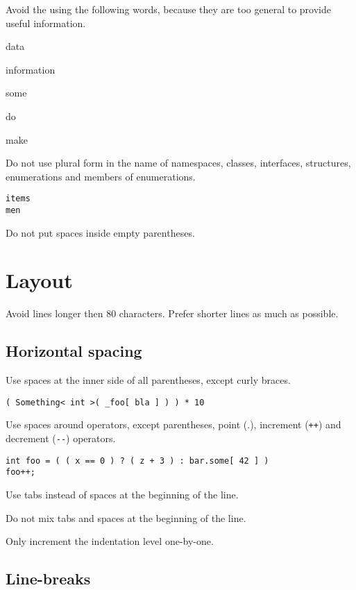 \documentclass[11pt,a4paper]{book}
\begin{document}
\avoidmark Avoid the using the following words, because they are too general to provide useful information.
\begin{compactitem}
\item data
\item information
\item some
\item do
\item make
\end{compactitem}

\notmark Do not use plural form in the name of namespaces, classes, interfaces, structures, enumerations and members of enumerations.
\begin{verbatim}
items
men
\end{verbatim}

\notmark Do not put spaces inside empty parentheses.

\section{Layout}

\avoidmark Avoid lines longer then 80 characters. Prefer shorter lines as much as possible.

\subsection{Horizontal spacing}

\domark Use spaces at the inner side of all parentheses, except curly braces.
\begin{verbatim}
( Something< int >( _foo[ bla ] ) ) * 10
\end{verbatim}

\domark Use spaces around operators, except parentheses, point (.), increment (\verb|++|) and decrement (\verb|--|) operators.
\begin{verbatim}
int foo = ( ( x == 0 ) ? ( z + 3 ) : bar.some[ 42 ] )
foo++;
\end{verbatim}

\domark Use tabs instead of spaces at the beginning of the line.

\notmark Do not mix tabs and spaces at the beginning of the line.

\domark Only increment the indentation level one-by-one.

\subsection{Line-breaks}
\end{document}
